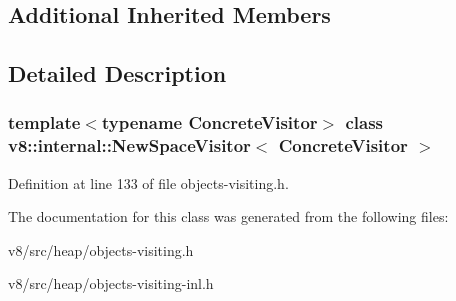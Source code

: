 \subsection*{Additional Inherited Members}


\subsection{Detailed Description}
\subsubsection*{template$<$typename Concrete\+Visitor$>$\newline
class v8\+::internal\+::\+New\+Space\+Visitor$<$ Concrete\+Visitor $>$}



Definition at line 133 of file objects-\/visiting.\+h.



The documentation for this class was generated from the following files\+:\begin{DoxyCompactItemize}
\item 
v8/src/heap/objects-\/visiting.\+h\item 
v8/src/heap/objects-\/visiting-\/inl.\+h\end{DoxyCompactItemize}
